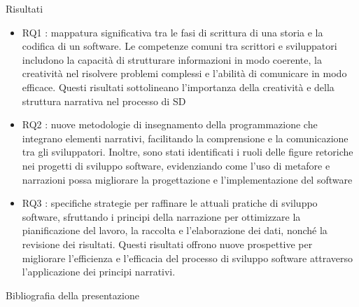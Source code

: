 \documentclass{beamer}
\begin{document}
\begin{frame}[t]{\centerline{Risultati}}
  \begin{itemize}
  \small
      \item RQ1 : mappatura significativa tra le fasi di scrittura di una storia e la codifica di un software. Le competenze comuni tra scrittori e sviluppatori includono la capacità di strutturare informazioni in modo coerente, la creatività nel risolvere problemi complessi e l'abilità di comunicare in modo efficace. Questi risultati sottolineano l'importanza della creatività e della struttura narrativa nel processo di SD
\item RQ2 : nuove metodologie di insegnamento della programmazione che integrano elementi narrativi, facilitando la comprensione e la comunicazione tra gli sviluppatori. Inoltre, sono stati identificati i ruoli delle figure retoriche nei progetti di sviluppo software, evidenziando come l'uso di metafore e narrazioni possa migliorare la progettazione e l'implementazione del software
\item RQ3 : specifiche strategie per raffinare le attuali pratiche di sviluppo software, sfruttando i principi della narrazione per ottimizzare la pianificazione del lavoro, la raccolta e l'elaborazione dei dati, nonché la revisione dei risultati. Questi risultati offrono nuove prospettive per migliorare l'efficienza e l'efficacia del processo di sviluppo software attraverso l'applicazione dei principi narrativi.
  \end{itemize}

\end{frame}






















\tiny
\begin{frame}{\centerline{Bibliografia della presentazione}}
\begin{multicols}{2}


\end{multicols}
\end{frame}
\end{document}
